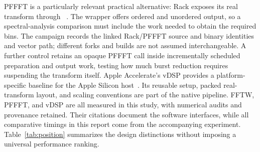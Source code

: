PFFFT is a particularly relevant practical alternative: Rack exposes its real
transform through ~\cite{pffft}. The wrapper offers ordered
and unordered output, so a spectral-analysis comparison must include the work
needed to obtain the required bins. The campaign records the linked Rack/PFFFT
source and binary identities and vector path; different forks and builds are
not assumed interchangeable. A further control retains an opaque PFFFT call
inside incrementally scheduled preparation and output work, testing how much
burst reduction requires suspending the transform itself. Apple Accelerate's
vDSP provides a platform-specific baseline for the Apple Silicon
host~\cite{vdsp}. Its reusable setup, packed real-transform layout, and scaling
conventions are part of the native pipeline. FFTW, PFFFT, and vDSP are all
measured in this study, with numerical audits and provenance retained.
Their citations document the software interfaces, while all comparative
timings in this report come from the accompanying experiment.
Table~\ref{tab:position} summarizes the design distinctions without imposing
a universal performance ranking.



